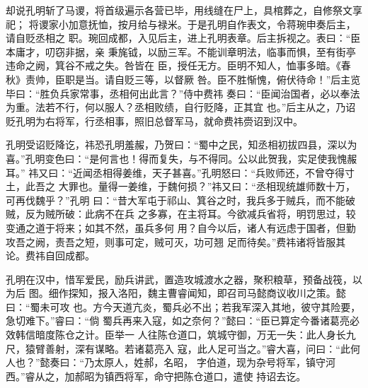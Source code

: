 却说孔明斩了马谡，将首级遍示各营已毕，用线缝在尸上，具棺葬之，自修祭文享祀；
将谡家小加意抚恤，按月给与禄米。于是孔明自作表文，令蒋琬申奏后主，请自贬丞相之
职。琬回成都，入见后主，进上孔明表章。后主拆视之。表曰：“臣本庸才，叨窃非据，亲
秉旄钺，以励三军。不能训章明法，临事而惧，至有街亭违命之阙，箕谷不戒之失。咎皆在
臣，授任无方。臣明不知人，恤事多暗。《春秋》责帅，臣职是当。请自贬三等，以督厥
咎。臣不胜惭愧，俯伏待命！”后主览毕曰：“胜负兵家常事，丞相何出此言？”侍中费祎
奏曰：“臣闻治国者，必以奉法为重。法若不行，何以服人？丞相败绩，自行贬降，正其宜
也。”后主从之，乃诏贬孔明为右将军，行丞相事，照旧总督军马，就命费祎赍诏到汉中。

孔明受诏贬降讫，祎恐孔明羞赧，乃贺曰：“蜀中之民，知丞相初拔四县，深以为
喜。”孔明变色曰：“是何言也！得而复失，与不得同。公以此贺我，实足使我愧赧耳。”
祎又曰：“近闻丞相得姜维，天子甚喜。”孔明怒曰：“兵败师还，不曾夺得寸土，此吾之
大罪也。量得一姜维，于魏何损？”祎又曰：“丞相现统雄师数十万，可再伐魏乎？”孔明
曰：“昔大军屯于祁山、箕谷之时，我兵多于贼兵，而不能破贼，反为贼所破：此病不在兵
之多寡，在主将耳。今欲减兵省将，明罚思过，较变通之道于将来；如其不然，虽兵多何
用？自今以后，诸人有远虑于国者，但勤攻吾之阙，责吾之短，则事可定，贼可灭，功可翘
足而待矣。”费祎诸将皆服其论。费祎自回成都。

孔明在汉中，惜军爱民，励兵讲武，置造攻城渡水之器，聚积粮草，预备战筏，以为后
图。细作探知，报入洛阳，魏主曹睿闻知，即召司马懿商议收川之策。懿曰：“蜀未可攻
也。方今天道亢炎，蜀兵必不出；若我军深入其地，彼守其险要，急切难下。”睿曰：“倘
蜀兵再来入寇，如之奈何？”懿曰：“臣已算定今番诸葛亮必效韩信暗度陈仓之计。臣举一
人往陈仓道口，筑城守御，万无一失：此人身长九尺，猿臂善射，深有谋略。若诸葛亮入
寇，此人足可当之。”睿大喜，问曰：“此何人也？”懿奏曰：“乃太原人，姓郝，名昭，
字伯道，现为杂号将军，镇守河西。”睿从之，加郝昭为镇西将军，命守把陈仓道口，遣使
持诏去讫。

